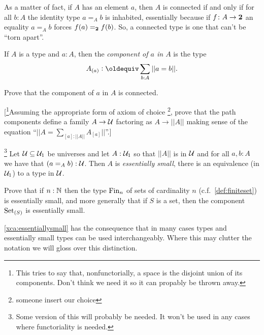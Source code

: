  As a matter of fact, if $A$ has an element $a$, then $A$ is connected if and only if for all $b:A$ the identity type $a=_Ab$ is inhabited, essentially because if $f\colon A\to\mathbf{2} $ an equality $a=_Ab$ forces $f(a)=_{\mathbf{2} }f(b)$.  So, a connected type is one that can't be ``torn apart''.  
\begin{definition}
    If $A$ is a type and $a:A$, then the \emph{component of $a$ in $A$} is the type
$$A_{(a)}\defequi \sum_{b:A}||a=b||.$$
\end{definition}
\begin{xca}
  Prove that the component of $a$ in $A$ is connected.  

 [\footnote{This tries to say that, nonfunctorially, a space is the disjoint union of its components.  Don't think we need it so it can propably be thrown away.}Assuming the appropriate form of axiom of choice \footnote{someone insert our choice}, prove that the path components define a family $A\to\mathcal{U}$ factoring as $A\to||A||$ making sense of the equation ``$||A=\sum_{[a]:||A||}A_{[a]}||$''.]
\end{xca}
\begin{xca}\label{xca:essentiallysmall} \footnote{Some version of this will probably be needed.  It won't be used in any cases where functoriality is needed.}
  Let $\mathcal{U}\subseteq\mathcal{U}_1$ be universes and let $A:\mathcal{U}_1$ so that $||A||$ is in $\mathcal{U}$ and for all $a,b:A$ we have that $(a=_Ab):\mathcal{U}$.  Then $A$ is \emph{essentially small}, \ie there is an equivalence (in $\mathcal{U}_1$) to a type in $\mathcal{U}$.  

Prove that if $n:\mathbb{N}$ then the type $\operatorname{Fin}_n$ of sets of cardinality $n$  (c.f.~\cref{def:finiteset}) is essentially small, and more generally that if $S$ is a set, then the component $\mathord{\mathrm{Set}}_{(S)}$ is essentially small.  
\end{xca}
\cref{xca:essentiallysmall} has the consequence that in many cases types and essentially small types can be used interchangeably.  Where this may clutter the notation we will gloss over this distinction.

